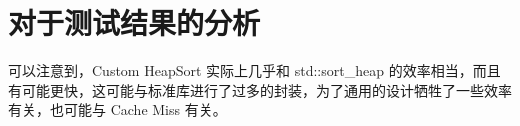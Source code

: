 \documentclass[UTF8]{ctexart}
\begin{document}
    
    
\section {对于测试结果的分析}
    
    可以注意到，Custom HeapSort 实际上几乎和 std::sort\_heap 的效率相当，而且有可能更快，这可能与标准库进行了过多的封装，为了通用的设计牺牲了一些效率有关，也可能与 Cache Miss 有关。
    
\end{document}
